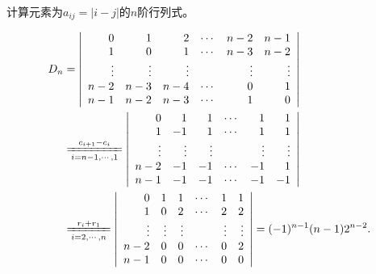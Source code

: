 \begin{frame}
\begin{testexample}
  计算元素为$a_{ij}=|i-j|$的$n$阶行列式。
\end{testexample} \pause 
\begin{jie}
  $$
  \begin{aligned}
    D_{n} &  =   \left|
      \begin{array}{rrrrrrr}
        0   & 1   & 2    & \cd & n-2  & n-1 \\ 
        1   & 0   & 1    & \cd & n-3  & n-2 \\
        \vd & \vd & \vd  &     & \vd  & \vd \\
        n-2 & n-3 & n-4  & \cd & 0     & 1 \\
        n-1 & n-2 & n-3  & \cd & 1  & 0 
      \end{array}
    \right| \\
    &   \xlongequal[i=n-1,\cd,1]{c_{i+1}-c_i}   
    \left|
      \begin{array}{rrrrrrr}
        0   & 1   & 1    & \cd & 1  & 1 \\ 
        1   & -1  & 1    & \cd & 1  & 1 \\
        \vd & \vd & \vd  &     & \vd & \vd \\
        n-2 & -1  & -1   & \cd & -1 & 1 \\
        n-1 & -1  & -1   & \cd & -1 & -1 
      \end{array}
    \right| \\
    & \xlongequal[i=2,\cd,n]{r_{i}+r_1}  
    \left|
      \begin{array}{rrrrrrr}
        0   & 1   & 1   & \cd & 1   & 1   \\ 
        1   & 0   & 2   & \cd & 2   & 2   \\
        \vd & \vd & \vd &     & \vd & \vd \\
        n-2 & 0   & 0  & \cd  & 0   & 2 \\
        n-1 & 0   & 0  & \cd  & 0   & 0 
      \end{array}
    \right| = (-1)^{n-1}(n-1)2^{n-2}.
  \end{aligned}
  $$
\end{jie}
%
\end{frame}

